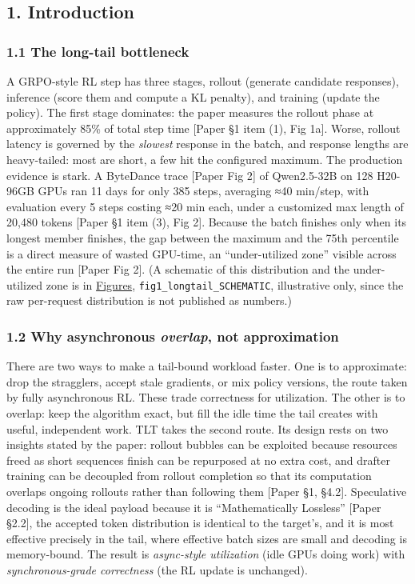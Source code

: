 \documentclass[
  11pt,
  letterpaper,
]{article}
\begin{document}
\subsection{1. Introduction}\label{introduction}

\subsubsection{1.1 The long-tail
bottleneck}\label{the-long-tail-bottleneck}

A GRPO-style RL step has three stages, rollout (generate candidate
responses), inference (score them and compute a KL penalty), and
training (update the policy). The first stage dominates: the paper
measures the rollout phase at approximately 85\% of total step time
{[}Paper §1 item (1), Fig 1a{]}. Worse, rollout latency is governed by
the \emph{slowest} response in the batch, and response lengths are
heavy-tailed: most are short, a few hit the configured maximum. The
production evidence is stark. A ByteDance trace {[}Paper Fig 2{]} of
Qwen2.5-32B on 128 H20-96GB GPUs ran 11 days for only 385 steps,
averaging ≈40 min/step, with evaluation every 5 steps costing ≈20 min
each, under a customized max length of 20,480 tokens {[}Paper §1 item
(3), Fig 2{]}. Because the batch finishes only when its longest member
finishes, the gap between the maximum and the 75th percentile is a
direct measure of wasted GPU-time, an ``under-utilized zone'' visible
across the entire run {[}Paper Fig 2{]}. (A schematic of this
distribution and the under-utilized zone is in
\hyperref[figures]{Figures}, \texttt{fig1\_longtail\_SCHEMATIC},
illustrative only, since the raw per-request distribution is not
published as numbers.)

\subsubsection{\texorpdfstring{1.2 Why asynchronous \emph{overlap}, not
approximation}{1.2 Why asynchronous overlap, not approximation}}\label{why-asynchronous-overlap-not-approximation}

There are two ways to make a tail-bound workload faster. One is to
approximate: drop the stragglers, accept stale gradients, or mix policy
versions, the route taken by fully asynchronous RL. These trade
correctness for utilization. The other is to overlap: keep the algorithm
exact, but fill the idle time the tail creates with useful, independent
work. TLT takes the second route. Its design rests on two insights
stated by the paper: rollout bubbles can be exploited because resources
freed as short sequences finish can be repurposed at no extra cost, and
drafter training can be decoupled from rollout completion so that its
computation overlaps ongoing rollouts rather than following them
{[}Paper §1, §4.2{]}. Speculative decoding is the ideal payload because
it is ``Mathematically Lossless'' {[}Paper §2.2{]}, the accepted token
distribution is identical to the target's, and it is most effective
precisely in the tail, where effective batch sizes are small and
decoding is memory-bound. The result is \emph{async-style utilization}
(idle GPUs doing work) with \emph{synchronous-grade correctness} (the RL
update is unchanged).
\end{document}
